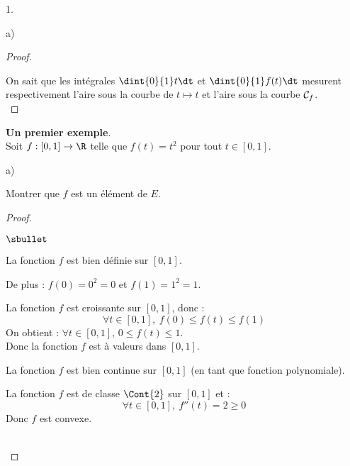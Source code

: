 \documentclass[11pt]{article}%
\begin{document}
\begin{noliste}{1.}
\begin{noliste}{a)}
\begin{proof}
\begin{center}
    \end{center}

  On sait que les intégrales $\dint{0}{1} t\dt$ et $\dint{0}{1} 
  f(t)\dt$ mesurent respectivement l'aire sous la courbe de $t \mapsto 
  t$ et l'aire sous la courbe ${\cal C}_f$. 
  ~\\[-1cm]
  \end{proof}
 \end{noliste}
 
 
 
 
 
 
 \item \textbf{Un premier exemple}.\\
 Soit $f : [0,1] \to \R$ telle que $f(t)= t^2$ pour tout $t \in [0,1]$. 
 \begin{noliste}{a)}
  \setlength{\itemsep}{2mm}
  \item Montrer que $f$ est un élément de $E$.
  
  \begin{proof}~
    \begin{noliste}{$\sbullet$}
      \item La fonction $f$ est bien définie sur $[0,1]$.
      \item De plus : $f(0)=0^2=0$ et $f(1)=1^2=1$.
      \item La fonction $f$ est croissante sur $[0,1]$, donc :
      \[
        \forall t \in [0,1], \ f(0) \leq f(t) \leq f(1)
      \]
      On obtient : $\forall t \in [0,1]$, $0 \leq f(t) \leq 1$.\\
      Donc la fonction $f$ est à valeurs dans $[0,1]$.
      \item La fonction $f$ est bien continue sur $[0,1]$ (en tant 
      que fonction polynomiale).
      \item La fonction $f$ est de classe $\Cont{2}$ sur $[0,1]$ et :
      \[
        \forall t \in [0,1], \ f''(t)=2 \geq 0
      \]
      Donc $f$ est convexe.
    \end{noliste}
    ~\\[-1cm]
  \end{proof}


\end{noliste}
\end{noliste}
\end{document}
